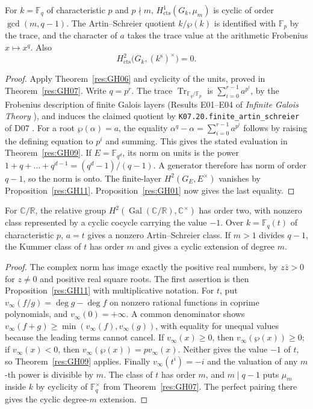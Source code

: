 \begin{example}
\label{res:GH12}
For \(k=\mathbb F_q\) of characteristic \(p\) and \(p\nmid m\),
\(H^1_{\mathrm{cts}}(G_k,\mu_m)\) is cyclic of order
\(\gcd(m,q-1)\). The Artin--Schreier quotient \(k/\wp(k)\)
is identified with \(\mathbb F_p\) by the trace, and the
character of \(a\) takes the trace value at the arithmetic
Frobenius \(x\mapsto x^q\). Also
\[
 H^2_{\mathrm{cts}}\bigl(G_k,(k^{\mathrm s})^\times\bigr)=0.
\]
\end{example}
\begin{proof}
Apply Theorem~\ref{res:GH06} and cyclicity of the units, proved in
Theorem~\ref{res:GH07}. Write \(q=p^r\). The trace
\(\operatorname{Tr}_{\mathbb F_q/\mathbb F_p}\) is
\(\sum_{i=0}^{r-1}a^{p^i}\), by the Frobenius description of
finite Galois layers (Results E01--E04 of \emph{Infinite Galois
Theory} \cite[PDF pp.~18--19]{mg-aft}), and induces the claimed
quotient by \texttt{K07.20.finite\_artin\_schreier} of D07
\cite[PDF p.~173]{mg-d07}. For a root \(\wp(\alpha)=a\),
the equality \(\alpha^q-\alpha=\sum_{i=0}^{r-1}a^{p^i}\) follows
by raising the defining equation to \(p^i\) and summing. This gives
the stated evaluation in Theorem~\ref{res:GH09}.
If \(E=\mathbb F_{q^d}\), its norm on units is the power
\(1+q+\dots+q^{d-1}=(q^d-1)/(q-1)\). A generator therefore has norm
of order \(q-1\), so the norm is onto. The finite-layer
\(H^2(G_E,E^\times)\) vanishes by Proposition~\ref{res:GH11}.
Proposition~\ref{res:GH01} now gives the last equality.
\end{proof}

\begin{example}
\label{res:GH13}
For \(\mathbb C/\mathbb R\), the relative group
\(H^2(\operatorname{Gal}(\mathbb C/\mathbb R),\mathbb C^\times)\)
has order two, with nonzero class represented by a cyclic cocycle
carrying the value \(-1\).
Over \(k=\mathbb F_q(t)\) of characteristic \(p\), \(a=t\) gives a
nonzero Artin--Schreier class. If \(m>1\) divides \(q-1\), the Kummer
class of \(t\) has order \(m\) and gives a cyclic extension of degree
\(m\).
\end{example}
\begin{proof}
The complex norm has image exactly the positive real numbers, by
\(z\bar z>0\) for \(z\ne0\) and positive real square roots. The
first assertion is then Proposition~\ref{res:GH11} with multiplicative
notation. For \(t\), put \(v_\infty(f/g)=\deg g-\deg f\) on
nonzero rational functions in coprime polynomials, and
\(v_\infty(0)=+\infty\). A common denominator shows
\(v_\infty(f+g)\geq\min(v_\infty(f),v_\infty(g))\), with equality
for unequal values because the leading terms cannot cancel.
If \(v_\infty(x)\geq0\), then \(v_\infty(\wp(x))\geq0\); if
\(v_\infty(x)<0\), then \(v_\infty(\wp(x))=p v_\infty(x)\).
Neither gives the value \(-1\) of \(t\), so
Theorem~\ref{res:GH09} applies. Finally \(v_\infty(t^i)=-i\)
and the valuation of any \(m\)-th power is divisible by \(m\).
The class of \(t\) has order \(m\), and \(m\mid q-1\) puts
\(\mu_m\) inside \(k\) by cyclicity of \(\mathbb F_q^\times\)
from Theorem~\ref{res:GH07}. The perfect pairing there gives the
cyclic degree-\(m\) extension.
\end{proof}

